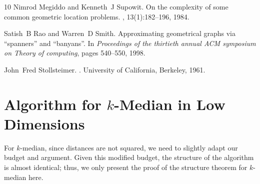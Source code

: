 \begin{thebibliography}{10}
Nimrod Megiddo and Kenneth~J Supowit.
\newblock On the complexity of some common geometric location problems.
, 13(1):182--196, 1984.

Satish~B Rao and Warren~D Smith.
\newblock Approximating geometrical graphs via “spanners” and
  “banyans”.
\newblock In {\em Proceedings of the thirtieth annual ACM symposium on Theory
  of computing}, pages 540--550, 1998.

John~Fred Stollsteimer.
.
\newblock University of California, Berkeley, 1961.

\end{thebibliography}

\appendix






\section{Algorithm for $k$-Median in Low Dimensions}\label{app:k-med}

For $k$-median, since distances are not squared, we need to slightly adapt our budget and argument. Given this modified budget, the structure of the algorithm is almost identical; thus, we only present the proof of the structure theorem for $k$-median here.

